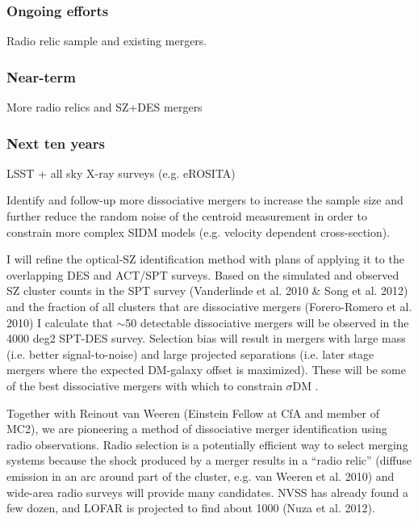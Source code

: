 \subsubsection{Ongoing efforts}

Radio relic sample and existing mergers.

\subsubsection{Near-term}

More radio relics and SZ+DES mergers

\subsubsection{Next ten years}

LSST + all sky X-ray surveys (e.g. eROSITA)

Identify and follow-up more dissociative mergers to increase the sample size and further reduce the random noise of the centroid measurement in order to constrain more complex SIDM models (e.g. velocity dependent cross-section).

I will refine the optical-SZ identification method with plans of applying it to the overlapping DES and ACT/SPT surveys.  Based on the simulated and observed SZ cluster counts in the SPT survey (Vanderlinde et al. 2010 \& Song et al. 2012) and the fraction of all clusters that are dissociative mergers (Forero-Romero et al. 2010) I calculate that $\sim$50 detectable dissociative mergers will be observed in the 4000 deg2 SPT-DES survey.  Selection bias will result in mergers with large mass (i.e. better signal-to-noise) and large projected separations (i.e. later stage mergers where the expected DM-galaxy offset is maximized).  These will be some of the best dissociative mergers with which to constrain $\sigma$DM .

Together with Reinout van Weeren (Einstein Fellow at CfA and member of MC2), we are pioneering a method of dissociative merger identification using radio observations.  Radio selection is a potentially efficient way to select merging systems because the shock produced by a merger results in a ``radio relic'' (diffuse emission in an arc around part of the cluster, e.g. van Weeren et al. 2010) and wide-area radio surveys will provide many candidates. NVSS has already found a few dozen, and LOFAR is projected to find about 1000 (Nuza et al. 2012).

